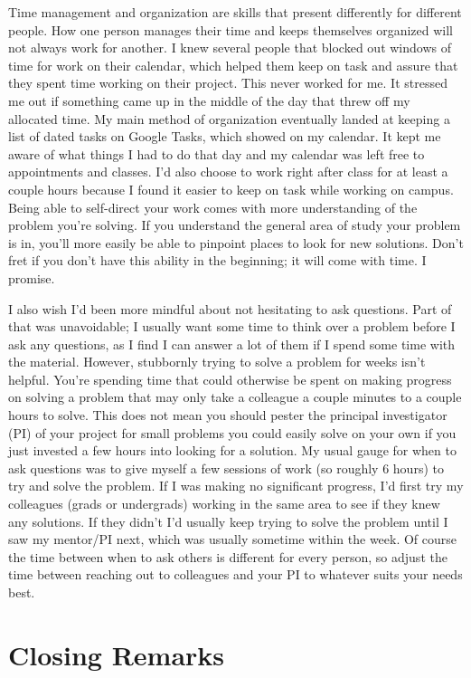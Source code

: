 \documentclass[12pt]{article}
\begin{document}
Time management and organization are skills that present differently for different people. How one person manages their time and keeps themselves organized will not always work for another. I knew several people that blocked out windows of time for work on their calendar, which helped them keep on task and assure that they spent time working on their project. This never worked for me. It stressed me out if something came up in the middle of the day that threw off my allocated time. My main method of organization eventually landed at keeping a list of dated tasks on Google Tasks, which showed on my calendar. It kept me aware of what things I had to do that day and my calendar was left free to appointments and classes. I'd also choose to work right after class for at least a couple hours because I found it easier to keep on task while working on campus. Being able to self-direct your work comes with more understanding of the problem you're solving. If you understand the general area of study your problem is in, you'll more easily be able to pinpoint places to look for new solutions. Don't fret if you don't have this ability in the beginning; it will come with time. I promise.

I also wish I'd been more mindful about not hesitating to ask questions. Part of that was unavoidable; I usually want some time to think over a problem before I ask any questions, as I find I can answer a lot of them if I spend some time with the material. However, stubbornly trying to solve a problem for weeks isn't helpful. You're spending time that could otherwise be spent on making progress on solving a problem that may only take a colleague a couple minutes to a couple hours to solve. This does not mean you should pester the principal investigator (PI) of your project for small problems you could easily solve on your own if you just invested a few hours into looking for a solution. My usual gauge for when to ask questions was to give myself a few sessions of work (so roughly 6 hours) to try and solve the problem. If I was making no significant progress, I'd first try my colleagues (grads or undergrads) working in the same area to see if they knew any solutions. If they didn't I'd usually keep trying to solve the problem until I saw my mentor/PI next, which was usually sometime within the week. Of course the time between when to ask others is different for every person, so adjust the time between reaching out to colleagues and your PI to whatever suits your needs best.

\section{Closing Remarks}
\end{document}
